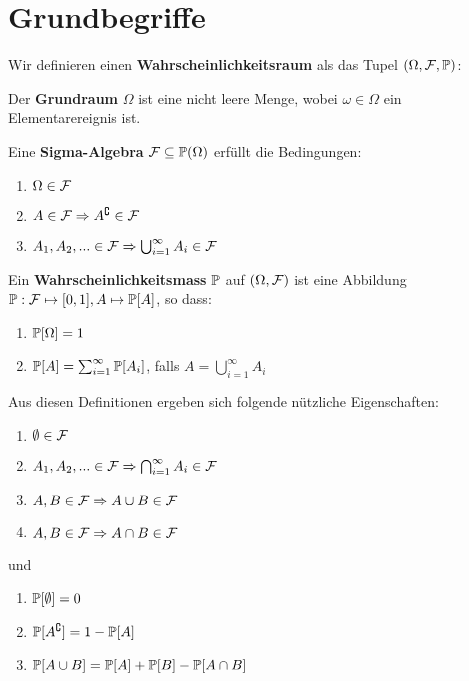 \section*{Grundbegriffe}

Wir definieren einen \textbf{Wahrscheinlichkeitsraum} als das Tupel $(\Omega, \mathcal{F}, \mathbb{P})$:

\begin{mainbox}{}
    Der \textbf{Grundraum} $\Omega$ ist eine nicht leere Menge, wobei $\omega \in \Omega$ ein Elementarereignis ist. \medskip
    
    Eine \textbf{Sigma-Algebra} $\mathcal{F} \subseteq \mathbb{P}(\Omega)$ erfüllt die Bedingungen:
    \begin{enumerate}
        \item $\Omega \in \mathcal{F}$
        \item $A \in \mathcal{F} \Rightarrow A^\complement \in \mathcal{F}$
        \item $A_1, A_2, ... \in \mathcal{F} \Rightarrow \bigcup^\infty_{i = 1} A_i \in \mathcal{F}$
    \end{enumerate} \medskip
    
    Ein \textbf{Wahrscheinlichkeitsmass} $\mathbb{P}$ auf $(\Omega, \mathcal{F})$ ist eine Abbildung $\mathbb{P} : \mathcal{F} \mapsto [0,1], A \mapsto \mathbb{P}[A]$, so dass:
    \begin{enumerate}
        \item $\mathbb{P}[\Omega] = 1$
        \item $\mathbb{P}[A] = \sum_{i=1}^\infty \mathbb{P}[A_i]$, falls $A = \bigcup_{i = 1}^\infty A_i$
    \end{enumerate}
\end{mainbox}

Aus diesen Definitionen ergeben sich folgende nützliche Eigenschaften:
\begin{subbox}{}
\begin{enumerate}
    \item $\emptyset \in \mathcal{F}$
    \item $A_1, A_2, ... \in \mathcal{F} \Rightarrow \bigcap_{i = 1}^\infty A_i \in \mathcal{F}$
    \item $A, B \in \mathcal{F} \Rightarrow A \cup B \in \mathcal{F}$
    \item $A, B \in \mathcal{F} \Rightarrow A \cap B \in \mathcal{F}$
\end{enumerate}
\end{subbox}
und
\begin{subbox}{}
\begin{enumerate}
    \item $\mathbb{P}[\emptyset] = 0$
    \item $\mathbb{P}[A^\complement] = 1 - \mathbb{P}[A]$
    \item $\mathbb{P}[A \cup B] = \mathbb{P}[A] + \mathbb{P}[B] - \mathbb{P}[A \cap B]$
\end{enumerate}
\end{subbox}

